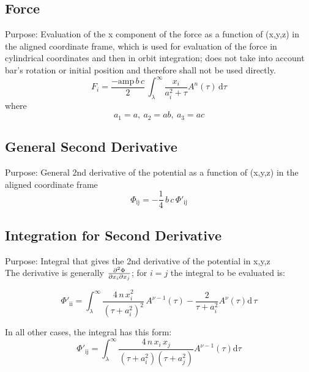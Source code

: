 \documentclass[a4paper,11pt]{article}
\begin{document}
		\subsection{Force} %
			Purpose: Evaluation of the x component of the force as a function of (x,y,z) in the aligned coordinate frame, which is used for evaluation of the force in cylindrical coordinates and then in orbit integration; does not take into account bar's rotation or initial position and therefore shall not be used directly.\\
   		\begin{equation}
   		F_i = \frac{-\mathrm{amp}\,b\,c}{2}\, \int_{\lambda}^{\infty} \frac{x_i}{a_i^2 + \tau} A^{n}(\tau)\,\mathrm{d} \tau
   		\end{equation}  
		where
		\begin{equation*}
			a_1 = a,~ a_2 = ab,~a_3 = ac
		\end{equation*}
		
		
		\subsection{General Second Derivative}
			Purpose: General 2nd derivative of the potential as a function of (x,y,z) in the aligned coordinate frame \\
		\begin{equation}
		\Phi_{\mathrm{ij}} = -\frac{1}{4}\,b\,c \,\Phi'_{\mathrm{ij}}	
		\end{equation}
	
		
		\subsection{Integration for Second Derivative}
			Purpose: Integral that gives the 2nd derivative of the potential in x,y,z \\
			
			\noindent The derivative is generally $ \pdv{\Phi}{x_i}{x_j} $; for $ i=j $ the integral to be evaluated is: 
			
		\begin{equation}
		\Phi'_{\mathrm{ii}} = \int_{\lambda}^{\infty} 
		 \frac{4\,n\,x_i^2}{(\tau + a_i^2)^2} \,A^{\nu-1}(\tau)
		- \frac{2}{\tau + a_i^2} A^{\nu}(\tau) \mathrm{d}\,\tau
		\end{equation}
		
			\noindent In all other cases, the integral has this form:
		\begin{equation}
		\Phi'_{\mathrm{ij}} = \int_{\lambda}^{\infty} 
		\frac{4\,n\,x_i\,x_j}{(\tau + a_i^2)(\tau + a_j^2)} A^{\nu-1}(\tau) \mathrm{d}\tau
		\end{equation}	
\end{document}
